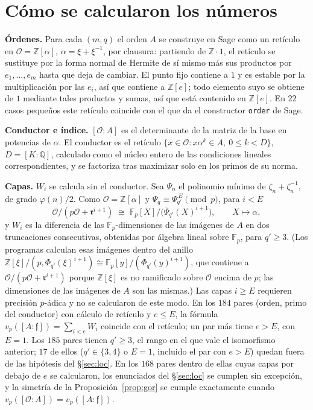 \documentclass[11pt,a4paper]{article}
\theoremstyle{definition}
\newcommand{\ZZ}{\mathbb{Z}}
\newcommand{\QQ}{\mathbb{Q}}
\newcommand{\FF}{\mathbb{F}}
\newcommand{\cO}{\mathcal{O}}
\newcommand{\cf}{\mathfrak{f}}
\newcommand{\rad}{\mathfrak{r}}
\begin{document}
\section{Cómo se calcularon los números}\label{sec:metodo}

\noindent\textbf{Órdenes.} Para cada $(m,q)$ el orden $A$ se construye en Sage como un retículo en $\cO=\ZZ[\alpha]$,
$\alpha=\xi+\xi^{-1}$, por clausura: partiendo de $\ZZ\cdot1$, el retículo se sustituye por la forma normal de
Hermite de sí mismo más sus productos por $e_1,\dots,e_m$ hasta que deja de cambiar. El punto fijo contiene a $1$ y es
estable por la multiplicación por las $e_i$, así que contiene a $\ZZ[e]$; todo elemento suyo se obtiene de $1$ mediante
tales productos y sumas, así que está contenido en $\ZZ[e]$. En $22$ casos pequeños este retículo coincide con el
que da el constructor \texttt{order} de Sage.

\noindent\textbf{Conductor e índice.} $[\cO:A]$ es el determinante de la matriz de la base en potencias de $\alpha$.
El conductor es el retículo $\{x\in\cO : x\alpha^k\in A,\ 0\le k<D\}$, $D=[K:\QQ]$, calculado como el núcleo entero de las
condiciones lineales correspondientes, y se factoriza tras maximizar solo en los primos de su norma.

\noindent\textbf{Capas.} $W_i$ se calcula sin el conductor. Sea $\Psi_n$ el polinomio mínimo de
$\zeta_n+\zeta_n^{-1}$, de grado $\varphi(n)/2$. Como $\cO=\ZZ[\alpha]$ y $\Psi_q\equiv\Psi_{q'}^{\,E}\pmod p$, para
$i<E$
\[
\cO/(p\cO+\rad^{i+1})\;\cong\;\FF_p[X]/\bigl(\overline\Psi_{q'}(X)^{i+1}\bigr),\qquad X\mapsto\alpha,
\]
y $W_i$ es la diferencia de las $\FF_p$-dimensiones de las imágenes de $A$ en dos truncaciones consecutivas,
obtenidas por álgebra lineal sobre $\FF_p$, para $q'\ge3$. (Los programas calculan esas imágenes dentro del anillo
$\ZZ[\xi]/(p,\Phi_{q'}(\xi)^{i+1})\cong\FF_p[y]/(\Phi_{q'}(y)^{i+1})$, que contiene a $\cO/(p\cO+\rad^{i+1})$ porque
$\ZZ[\xi]$ es no ramificado sobre $\cO$ encima de $p$; las dimensiones de las imágenes de $A$ son las mismas.) Las
capas $i\ge E$ requieren precisión $p$-ádica y no se calcularon de este modo. En los $184$ pares
(orden, primo del conductor) con cálculo de retículo y $e\le E$, la fórmula $v_p([A:\cf])=\sum_{i<e}W_i$ coincide con
el retículo; un par más tiene $e>E$, con $E=1$. Los $185$ pares tienen $q'\ge3$, el rango en el que vale el
isomorfismo anterior; $17$ de ellos ($q'\in\{3,4\}$ o $E=1$, incluido el par con $e>E$) quedan fuera de las hipótesis del \S\ref{sec:loc}. En los
$168$ pares dentro de ellas cuyas capas por debajo de $e$ se calcularon, los enunciados del \S\ref{sec:loc} se cumplen sin
excepción, y la simetría de la Proposición~\ref{prop:gor} se cumple exactamente cuando $v_p([\cO:A])=v_p([A:\cf])$.
\end{document}
